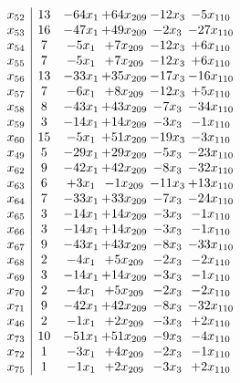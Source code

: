 \documentclass[11pt]{article}
\begin{document}
\[\begin{array}{c| c c@{\hskip 2pt} c@{\hskip 2pt} c@{\hskip 2pt} c@{\hskip 2pt} }
 x_{52}   &  13 & -64 x_{1} & + 64 x_{209} & -12 x_{3} & -5 x_{110}\\
 x_{53}   &  16 & -47 x_{1} & + 49 x_{209} & -2 x_{3} & -27 x_{110}\\
 x_{54}   &  7 & -5 x_{1} & + 7 x_{209} & -12 x_{3} & + 6 x_{110}\\
 x_{55}   &  7 & -5 x_{1} & + 7 x_{209} & -12 x_{3} & + 6 x_{110}\\
 x_{56}   &  13 & -33 x_{1} & + 35 x_{209} & -17 x_{3} & -16 x_{110}\\
 x_{57}   &  7 & -6 x_{1} & + 8 x_{209} & -12 x_{3} & + 5 x_{110}\\
 x_{58}   &  8 & -43 x_{1} & + 43 x_{209} & -7 x_{3} & -34 x_{110}\\
 x_{59}   &  3 & -14 x_{1} & + 14 x_{209} & -3 x_{3} & -1 x_{110}\\
 x_{60}   &  15 & -5 x_{1} & + 51 x_{209} & -19 x_{3} & -3 x_{110}\\
 x_{49}   &  5 & -29 x_{1} & + 29 x_{209} & -5 x_{3} & -23 x_{110}\\
 x_{62}   &  9 & -42 x_{1} & + 42 x_{209} & -8 x_{3} & -32 x_{110}\\
 x_{63}   &  6 & + 3 x_{1} & -1 x_{209} & -11 x_{3} & + 13 x_{110}\\
 x_{64}   &  7 & -33 x_{1} & + 33 x_{209} & -7 x_{3} & -24 x_{110}\\
 x_{65}   &  3 & -14 x_{1} & + 14 x_{209} & -3 x_{3} & -1 x_{110}\\
 x_{66}   &  3 & -14 x_{1} & + 14 x_{209} & -3 x_{3} & -1 x_{110}\\
 x_{67}   &  9 & -43 x_{1} & + 43 x_{209} & -8 x_{3} & -33 x_{110}\\
 x_{68}   &  2 & -4 x_{1} & + 5 x_{209} & -2 x_{3} & -2 x_{110}\\
 x_{69}   &  3 & -14 x_{1} & + 14 x_{209} & -3 x_{3} & -1 x_{110}\\
 x_{70}   &  2 & -4 x_{1} & + 5 x_{209} & -2 x_{3} & -2 x_{110}\\
 x_{71}   &  9 & -42 x_{1} & + 42 x_{209} & -8 x_{3} & -32 x_{110}\\
 x_{46}   &  2 & -1 x_{1} & + 2 x_{209} & -3 x_{3} & + 2 x_{110}\\
 x_{73}   &  10 & -51 x_{1} & + 51 x_{209} & -9 x_{3} & -4 x_{110}\\
 x_{72}   &  1 & -3 x_{1} & + 4 x_{209} & -2 x_{3} & -1 x_{110}\\
 x_{75}   &  1 & -1 x_{1} & + 2 x_{209} & -3 x_{3} & + 2 x_{110}\\

\end{array}\]
\end{document}
